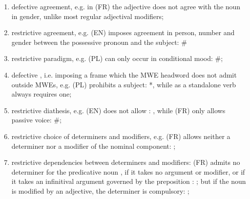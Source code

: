 \documentclass[output=paper]{langsci/langscibook}
\begin{document}
\begin{enumerate}
\item\label{lic:def-agr} defective agreement, e.g. in (FR)  the adjective does not agree with the noun in gender, unlike most regular adjectival modifiers;
\item\label{lic:restr-agr} restrictive agreement, e.g. (EN)  imposes agreement in person, number and gender between the possessive pronoun and the subject: \#
\item\label{lic:restr-par} restrictive paradigm, e.g. (PL)  can only occur in conditional mood: \#;
\item\label{lic:def-subcat} defective , i.e. imposing a  frame which the MWE headword does not admit outside MWEs, e.g. (PL)  prohibits a subject: *, while  as a standalone verb always requires one; 
\item\label{lic:restr-dia} restrictive diathesis, e.g. (EN)  does not allow : , while (FR)  only allows passive voice: \#;
\item\label{lic:restr-det-mod} restrictive choice of determiners and modifiers, e.g. (FR)  allows neither a determiner nor a  modifier of the nominal component: ;
\item\label{lic:restr-det-mod-comb} restrictive dependencies  between determiners and modifiers: (FR)  admits no determiner for the predicative noun , if it takes no argument or modifier, or if it takes an infinitival argument governed by the preposition : ; but if the noun is modified by an adjective, the determiner is compulsory: ;

\end{enumerate}
\end{document}
